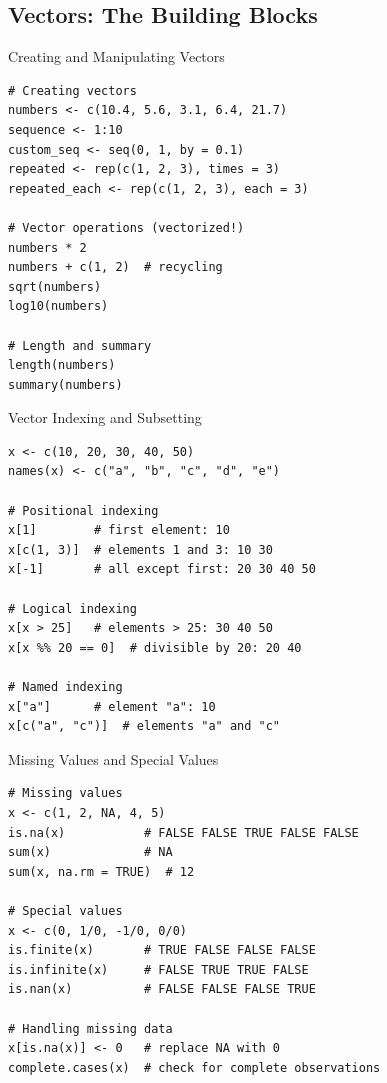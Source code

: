 \documentclass[aspectratio=169]{beamer}
\begin{document}
\subsection{Vectors: The Building Blocks}

\begin{frame}[fragile]{Creating and Manipulating Vectors}
\begin{lstlisting}
# Creating vectors
numbers <- c(10.4, 5.6, 3.1, 6.4, 21.7)
sequence <- 1:10
custom_seq <- seq(0, 1, by = 0.1)
repeated <- rep(c(1, 2, 3), times = 3)
repeated_each <- rep(c(1, 2, 3), each = 3)

# Vector operations (vectorized!)
numbers * 2
numbers + c(1, 2)  # recycling
sqrt(numbers)
log10(numbers)

# Length and summary
length(numbers)
summary(numbers)
\end{lstlisting}
\end{frame}

\begin{frame}[fragile]{Vector Indexing and Subsetting}
\begin{lstlisting}
x <- c(10, 20, 30, 40, 50)
names(x) <- c("a", "b", "c", "d", "e")

# Positional indexing
x[1]        # first element: 10
x[c(1, 3)]  # elements 1 and 3: 10 30
x[-1]       # all except first: 20 30 40 50

# Logical indexing
x[x > 25]   # elements > 25: 30 40 50
x[x %% 20 == 0]  # divisible by 20: 20 40

# Named indexing
x["a"]      # element "a": 10
x[c("a", "c")]  # elements "a" and "c"
\end{lstlisting}
\end{frame}

\begin{frame}[fragile]{Missing Values and Special Values}
\begin{lstlisting}
# Missing values
x <- c(1, 2, NA, 4, 5)
is.na(x)           # FALSE FALSE TRUE FALSE FALSE
sum(x)             # NA
sum(x, na.rm = TRUE)  # 12

# Special values
x <- c(0, 1/0, -1/0, 0/0)
is.finite(x)       # TRUE FALSE FALSE FALSE
is.infinite(x)     # FALSE TRUE TRUE FALSE
is.nan(x)          # FALSE FALSE FALSE TRUE

# Handling missing data
x[is.na(x)] <- 0   # replace NA with 0
complete.cases(x)  # check for complete observations
\end{lstlisting}
\end{frame}
\end{document}
